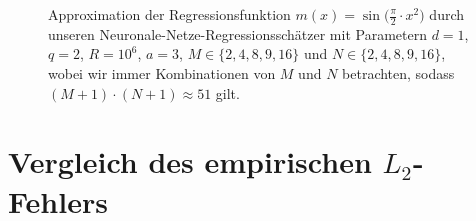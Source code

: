 \begin{figure}
    \begin{subfigure}[b]{0.5\textwidth}
        \centering
        \scalebox{0.9}{
          }
          \label{test2}
    \end{subfigure}
    \begin{subfigure}[b]{0.5\textwidth}
    \centering
    \scalebox{0.9}{
           }
           \label{fig:test}
    \end{subfigure}
       \hspace{0.1cm}
    \begin{subfigure}[b]{0.5\textwidth}
    \centering
    \scalebox{0.9}{
	}
	\label{teat1}
    \end{subfigure}
    \begin{subfigure}[b]{0.5\textwidth}
    \centering
     \scalebox{0.9}{
           }
           \label{test3}
    \end{subfigure}
    \begin{subfigure}[b]{1\textwidth}
        \centering
    \end{subfigure}
     \caption{Approximation der Regressionsfunktion $m(x) = \sin\big(\frac{\pi}{2} \cdot x^2\big)$ durch unseren Neuronale-Netze-Regressionsschätzer mit Parametern $d = 1$, $q = 2$, $R = 10^6$, $a = 3$, $M \in \{2,4,8,9,16\}$ und $N \in \{2,4,8,9,16\}$, wobei wir immer Kombinationen von $M$ und $N$ betrachten, sodass $(M + 1)\cdot(N + 1) \approx 51$ gilt.}
    \label{fig:subfig.a.5}
\end{figure}
\newpage
\section{Vergleich des empirischen $L_2$-Fehlers}

